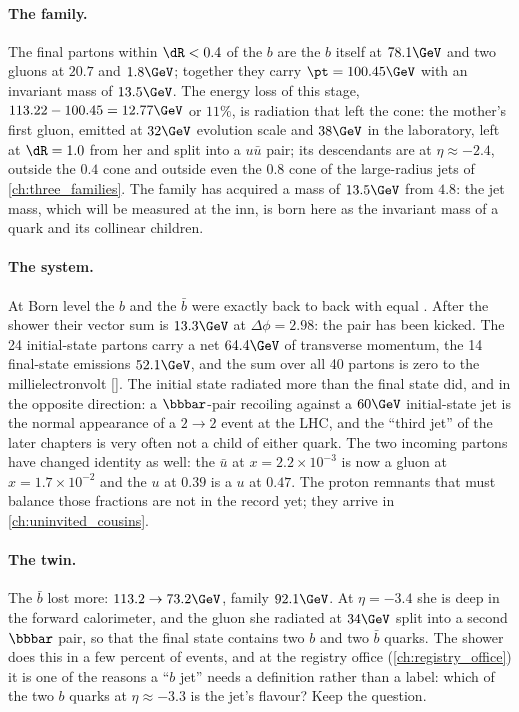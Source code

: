 \paragraph{The family.} The final partons within $\dR<0.4$ of the $b$ are
the $b$ itself at $78.1\GeV$ and two gluons at $20.7$ and $1.8\GeV$;
together they carry $\pt=100.45\GeV$ with an invariant mass of
$13.5\GeV$. The energy loss of this stage, $113.22-100.45=12.77\GeV$ or
$11\%$, is radiation that left the cone: the mother's first gluon, emitted
at $32\GeV$ evolution scale and $38\GeV$ in the laboratory, left at
$\dR=1.0$ from her and split into a $u\bar u$ pair; its descendants are at
$\eta\approx-2.4$, outside the $0.4$ cone and outside even the $0.8$ cone
of the large-radius jets of \cref{ch:three_families}. The family has acquired a mass of $13.5\GeV$ from $4.8$: the
jet mass, which will be measured at the inn, is born here as the invariant
mass of a quark and its collinear children.

\paragraph{The system.} At Born level the $b$ and the $\bar b$ were exactly
back to back with equal \pt. After the shower their vector sum is
$13.3\GeV$ at $\Delta\phi=2.98$: the pair has been kicked. The 24
initial-state partons carry a net $64.4\GeV$ of transverse momentum, the 14
final-state emissions $52.1\GeV$, and the sum over all 40 partons is zero to
the millielectronvolt []. The initial state radiated
more than the final state did, and in the opposite direction: a
$\bbbar$-pair recoiling against a $60\GeV$ initial-state jet is the
normal appearance of a $2\to2$ event at the LHC, and the ``third jet'' of
the later chapters is very often not a child of either quark. The two
incoming partons have changed identity as well: the $\bar u$ at
$x=2.2\times10^{-3}$ is now a gluon at $x=1.7\times10^{-2}$ and the $u$ at
$0.39$ is a $u$ at $0.47$. The proton remnants that must balance those
fractions are not in the record yet; they arrive in
\cref{ch:uninvited_cousins}.

\paragraph{The twin.} The $\bar b$ lost more: $113.2\to73.2\GeV$, family
$92.1\GeV$. At $\eta=-3.4$ she is deep in the forward calorimeter, and the
gluon she radiated at $34\GeV$ split into a second $\bbbar$ pair,
so that the final state contains two $b$ and two $\bar b$ quarks. The
shower does this in a few percent of events, and at the registry office
(\cref{ch:registry_office}) it is one of the reasons a ``$b$ jet'' needs a
definition rather than a label: which of the two $b$ quarks at
$\eta\approx-3.3$ is the jet's flavour? Keep the question.

